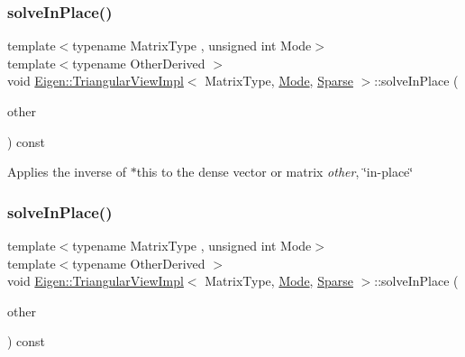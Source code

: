 \subsubsection{\texorpdfstring{solveInPlace()}{solveInPlace()}\hspace{0.1cm}{\footnotesize\ttfamily [1/2]}}
{\footnotesize\ttfamily template$<$typename Matrix\+Type , unsigned int Mode$>$ \\
template$<$typename Other\+Derived $>$ \\
void \mbox{\hyperlink{class_eigen_1_1_triangular_view_impl}{Eigen\+::\+Triangular\+View\+Impl}}$<$ Matrix\+Type, \mbox{\hyperlink{struct_mode}{Mode}}, \mbox{\hyperlink{struct_eigen_1_1_sparse}{Sparse}} $>$\+::solve\+In\+Place (\begin{DoxyParamCaption}\item[{\mbox{\hyperlink{class_eigen_1_1_matrix_base}{Matrix\+Base}}$<$ Other\+Derived $>$ \&}]{other }\end{DoxyParamCaption}) const}

Applies the inverse of {\ttfamily $\ast$this} to the dense vector or matrix {\itshape other}, \char`\"{}in-\/place\char`\"{} \mbox{\label{class_eigen_1_1_triangular_view_impl_3_01_matrix_type_00_01_mode_00_01_sparse_01_4_a70190d4105e1fd4f27abbf73365dfa0c}} 
\subsubsection{\texorpdfstring{solveInPlace()}{solveInPlace()}\hspace{0.1cm}{\footnotesize\ttfamily [2/2]}}
{\footnotesize\ttfamily template$<$typename Matrix\+Type , unsigned int Mode$>$ \\
template$<$typename Other\+Derived $>$ \\
void \mbox{\hyperlink{class_eigen_1_1_triangular_view_impl}{Eigen\+::\+Triangular\+View\+Impl}}$<$ Matrix\+Type, \mbox{\hyperlink{struct_mode}{Mode}}, \mbox{\hyperlink{struct_eigen_1_1_sparse}{Sparse}} $>$\+::solve\+In\+Place (\begin{DoxyParamCaption}\item[{\mbox{\hyperlink{class_eigen_1_1_sparse_matrix_base}{Sparse\+Matrix\+Base}}$<$ Other\+Derived $>$ \&}]{other }\end{DoxyParamCaption}) const}


